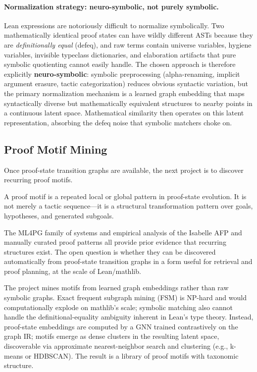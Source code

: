 \documentclass[12pt, a4paper]{article}
\begin{document}
\paragraph{Normalization strategy: neuro-symbolic, not purely symbolic.}
Lean expressions are notoriously difficult to normalize symbolically. Two
mathematically identical proof states can have wildly different ASTs because
they are \emph{definitionally equal} (defeq), and raw terms contain universe
variables, hygiene variables, invisible typeclass dictionaries, and elaboration
artifacts that pure symbolic quotienting cannot easily handle. The chosen
approach is therefore explicitly \textbf{neuro-symbolic}: symbolic preprocessing
(alpha-renaming, implicit argument erasure, tactic categorization) reduces
obvious syntactic variation, but the primary normalization mechanism is a
learned graph embedding that maps syntactically diverse but mathematically
equivalent structures to nearby points in a continuous latent space.
Mathematical similarity then operates on this latent representation, absorbing
the defeq noise that symbolic matchers choke on.

\subsection{Proof Motif Mining}
\label{sec:motif-mining}

Once proof-state transition graphs are available, the next project is to
discover recurring proof motifs.

A proof motif is a repeated local or global pattern in proof-state evolution.
It is not merely a tactic sequence---it is a structural transformation
pattern over goals, hypotheses, and generated subgoals.

The ML4PG family of systems \citep{komendantskaya2012ml4pg, heras2014recycling}
and empirical analysis of the Isabelle AFP \citep{blanchette2015mining} and
manually curated proof patterns \citep{freitas2014} all provide prior evidence
that recurring structures exist. The open question is whether they can be
discovered automatically from proof-state transition graphs in a form useful
for retrieval and proof planning, at the scale of Lean/mathlib.

The project mines motifs from learned graph embeddings rather than raw
symbolic graphs. Exact frequent subgraph mining (FSM) is NP-hard and would
computationally explode on mathlib's scale; symbolic matching also cannot
handle the definitional-equality ambiguity inherent in Lean's type theory.
Instead, proof-state embeddings are computed by a GNN trained contrastively
on the graph IR; motifs emerge as dense clusters in the resulting latent
space, discoverable via approximate nearest-neighbor search and clustering
(e.g., k-means or HDBSCAN). The result is a library of proof motifs with
taxonomic structure.
\end{document}

